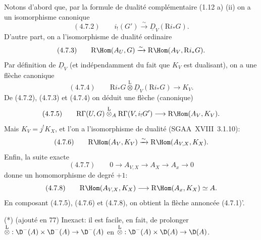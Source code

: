 Notons d'abord que, par la formule de dualité complémentaire (1.12 a) (ii) on a un isomorphisme canonique
\[
(4.7.2)\qquad i_!(G')\xrightarrow{\sim}\underline{D}_V(\mathrm{R} i_*G).
\]
D'autre part, on a l'isomorphisme de dualité ordinaire
\[
(4.7.3)\qquad \mathrm{R}\Hom(A_U,G)\xrightarrow{\sim}\mathrm{R}\Hom(A_V,\mathrm{R} i_*G).
\]
Par définition de $\underline{D}_V$ (et indépendamment du fait que $K_V$ est dualisant), on a une flèche canonique
\[
(4.7.4)\qquad \mathrm{R} i_*G\overset{\mathrm{L}}{\otimes}\underline{D}_V(\mathrm{R} i_*G)\longrightarrow K_V.
\]
De (4.7.2), (4.7.3) et (4.7.4) on déduit une flèche (canonique)
\[
(4.7.5)\qquad \mathrm{R}\Gamma(U,G)\overset{\mathrm{L}}{\otimes}_A\mathrm{R}\Gamma(V,i_!G')\longrightarrow \mathrm{R}\Hom(A_V,K_V).
\]
Mais $K_V=j^{!}K_X$, et l'on a l'isomorphisme de dualité (SGAA~XVIII~3.1.10):
\[
(4.7.6)\qquad \mathrm{R}\Hom(A_V,K_V)\xrightarrow{\sim}\mathrm{R}\Hom(A_{V,X},K_X).
\]
Enfin, la suite exacte
\[
(4.7.7)\qquad 0\longrightarrow A_{V,X}\longrightarrow A_X\longrightarrow A_x\longrightarrow 0
\]
donne un homomorphisme de degré $+1$:
\[
(4.7.8)\qquad \mathrm{R}\Hom(A_{V,X},K_X)\longrightarrow \mathrm{R}\Hom(A_x,K_X)\simeq A.
\]
En composant (4.7.5), (4.7.6) et (4.7.8), on obtient la flèche annoncée (4.7.1)'.

(*) (ajouté en 77) Inexact: il est facile, en fait, de prolonger $\overset{\mathrm{L}}{\otimes}:\D^-(A)\times\D^-(A)\to\D^-(A)$ en $\overset{\mathrm{L}}{\otimes}:\D^-(A)\times\D(A)\to\D(A)$.

